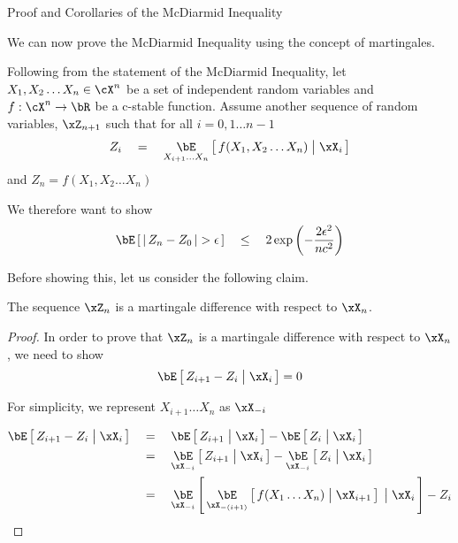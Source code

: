 \documentclass[11pt,a4paper]{article}
\begin{document}
\begin{ssection}{Proof and Corollaries of the McDiarmid Inequality}
	
	We can now prove the McDiarmid Inequality using the concept of martingales. \br
	
	
	Following from the statement of the McDiarmid Inequality, let $X_1, X_2 \dots X_n \in \cX^n$ be a set of independent random variables and $f : \cX^n \ra \bR$ be a c-stable function. Assume another sequence of random variables, $\xZ_{n + 1}$ such that for all $i = 0, 1 \dots n - 1$
	\begin{align*}
		Z_i	\eq	\E[X_{i + 1} \dots X_n]{f(X_1, X_2 \dots X_n) \pipe \xX_i} 
	\end{align*}
	and $Z_n = f(X_1, X_2 \dots X_n)$
	
	We therefore want to show
	\begin{align*}
		\E{\abs{Z_n - Z_0} > \epsilon}	\qle	2 \texp{- \frac{2 \epsilon^2}{n c^2}} 
	\end{align*}
	
	Before showing this, let us consider the following claim. \br
	
	\begin{claim}
		The sequence $\xZ_n$ is a martingale difference with respect to $\xX_n$.
	\end{claim}
	\begin{proof}
		In order to prove that $\xZ_n$ is a martingale difference with respect to $\xX_n$, we need to show
		\begin{align*}
			\E{Z_{i + 1} - Z_i \pipe \xX_i} = 0 
		\end{align*}
		
		For simplicity, we represent $X_{i + 1} \dots X_n$ as $\xX_{-i}$
		
		\begin{align*}
			\E{Z_{i + 1} - Z_i \pipe \xX_i} & \eq	\E{Z_{i + 1} \pipe \xX_i}	- \E{Z_i \pipe \xX_i}                                        \\
			                                & \eq	\E[\xX_{-i}]{Z_{i + 1} \pipe \xX_i} - \E[\xX_{-i}]{Z_i \pipe \xX_i}                    \\
			                                & \eq	\E[\xX_{-i}]{\E[\xX_{-(i + 1)}]{f(X_1 \dots X_n) \pipe \xX_{i + 1}} \pipe \xX_i} - Z_i 
		\end{align*}
		

\end{proof}
\end{ssection}
\end{document}
